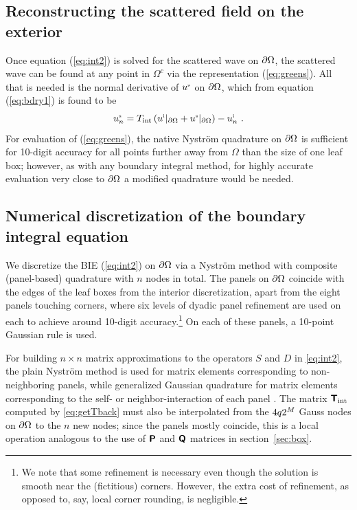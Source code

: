 \documentclass[11pt,final]{amsart}
\theoremstyle{definition}
\numberwithin{remark}{section}
\numberwithin{definition}{section}
\numberwithin{pro}{section}
\begin{document}
\subsection{Reconstructing the scattered field on the exterior}
\label{sec:exterior}
Once equation (\ref{eq:int2}) is solved for the scattered wave on ${\partial\Omega}$, the scattered
wave can be found at any point in $\Omega^c$ via the representation (\ref{eq:greens}).
All that is needed is the normal derivative of $u^{\mbox{\tiny s}}$ on ${\partial\Omega}$, which
from equation (\ref{eq:bdry1}) is found to be
\begin{equation}
u^{\mbox{\tiny s}}_n = T_{\rm int} \left(u^{\mbox{\tiny i}}|_{\partial\Omega} +u^{\mbox{\tiny s}}|_{\partial\Omega}\right) -  u^{\mbox{\tiny i}}_n
~.
\label{eq:normw}
\end{equation}
For evaluation of (\ref{eq:greens}),
the native Nystr\"om quadrature on ${\partial\Omega}$ is sufficient for 10-digit accuracy for
all points further away from $\Omega$ than the size of one leaf box;
however, as with any boundary integral method,
for highly accurate evaluation very close to ${\partial\Omega}$ a modified quadrature would be needed.


\subsection{Numerical discretization of the boundary integral equation}
We discretize the BIE (\ref{eq:int2}) on ${\partial\Omega}$ via a Nystr\"om method
with composite (panel-based) quadrature with $n$ nodes in total.
The panels on ${\partial\Omega}$ coincide with the edges of the
leaf boxes from the interior discretization, apart from the eight panels touching corners,
where six levels of dyadic panel refinement are used on each to achieve around 10-digit
accuracy.\footnote{We note that some refinement is necessary even though the solution
is smooth near the (fictitious) corners. However, the extra cost of refinement, as opposed to, say, local corner rounding, is negligible.}
On each of these panels, a 10-point Gaussian rule is used.

For building $n\times n$ matrix approximations to the operators $S$ and $D$ in \eqref{eq:int2},
the plain Nystr\"om method is used for matrix elements corresponding to non-neighboring panels,
while generalized Gaussian quadrature for matrix elements
corresponding to the self- or neighbor-interaction of each panel \cite{gen_quad}.
The matrix $\bm{\mathsf{T}}_{\rm int}$ computed by \eqref{eq:getTback} must also be interpolated
from the $4q2^M$ Gauss nodes on ${\partial\Omega}$ to the $n$ new nodes; since the
panels mostly coincide, this is a local operation analogous to the use
of $\bm{\mathsf{P}}$ and $\bm{\mathsf{Q}}$ matrices in section~\ref{sec:box}.
\end{document}
